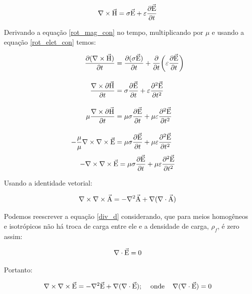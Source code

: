             \begin{equation}
                \label{rot_mag_con}
                \nabla \times \vec{\textrm{H}} = \sigma \vec{\textrm{E}} + \varepsilon \dfrac{\partial \vec{\textrm{E}}}{\partial t}
            \end{equation}
            
            Derivando a equação \ref{rot_mag_con} no tempo, multiplicando por $\mu$ e usando a equação \ref{rot_elet_con} temos:
            
            
\begin{align*}
\dfrac{\partial (\nabla \times \vec{\textrm{H}})}{\partial t} & = \dfrac{\partial (\sigma \vec{\textrm{E}})}{\partial t} + \dfrac{\partial}{\partial t} \bigg(\varepsilon \dfrac{\partial \vec{\textrm{E}}}{\partial t}\bigg)\\[10pt]
             \dfrac{\nabla \times \partial \vec{\textrm{H}}}{\partial t} & = \sigma \dfrac{\partial \vec{\textrm{E}}}{\partial t} + \varepsilon \dfrac{\partial^2 \vec{\textrm{E}}}{\partial t^2} \\[10pt]
             \mu \dfrac{\nabla \times \partial \vec{\textrm{H}}}{\partial t} & = \mu \sigma \dfrac{\partial \vec{\textrm{E}}}{\partial t} + \mu \varepsilon \dfrac{\partial^2 \vec{\textrm{E}}}{\partial t^2} \\[10pt]
             -\dfrac{\mu}{\mu} \nabla \times \nabla \times \vec{\textrm{E}} & = \mu \sigma \dfrac{\partial \vec{\textrm{E}}}{\partial t} + \mu \varepsilon \dfrac{\partial^2 \vec{\textrm{E}}}{\partial t^2}
             \end{align*}
             \begin{equation}
                \label{menos_rot_e}
              - \nabla \times \nabla \times \vec{\textrm{E}} = \mu \sigma \dfrac{\partial \vec{\textrm{E}}}{\partial t} + \mu \varepsilon \dfrac{\partial^2 \vec{\textrm{E}}}{\partial t^2}
             \end{equation}
                
            Usando a identidade vetorial:
            
            \begin{equation}
             \nabla \times \nabla \times \vec{\textrm{A}} = -\nabla^2 \vec{\textrm{A}} + \nabla(\nabla \cdot \vec{\textrm{A}})
            \end{equation}
            
            Podemos reescrever a equação \ref{div_d} considerando, que para meios homogêneos e isotrópicos não há troca de carga entre ele e a densidade de carga, $\rho_f$, é zero assim:
            
            \begin{equation}
             \nabla \cdot \vec{\textrm{E}} = 0
            \end{equation}
            
            Portanto:
            
            \begin{equation}
             \label{rot_rot_e}
             \nabla \times \nabla \times \vec{\textrm{E}} = -\nabla^2 \vec{\textrm{E}} + \nabla(\nabla \cdot \vec{\textrm{E}});\,\,\,\,\,\,\, \textrm{onde}\,\,\,\,\,\,\,   \nabla(\nabla \cdot \vec{\textrm{E}})=0
            \end{equation}
            
